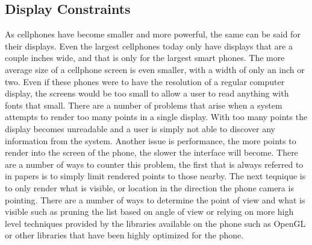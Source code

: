 \documentclass{acm_proc_article-sp}
\begin{document}
\subsection{Display Constraints}
As cellphones have become smaller and more powerful, the same can be said for their displays.  Even the largest cellphones today only have displays that are a couple inches wide, and that is only for the largest smart phones.  The more average size of a cellphone screen is even smaller, with a width of only an inch or two.  Even if these phones were to have the resolution of a regular computer display, the screens would be too small to allow a user to read anything with fonts that small.
There are a number of problems that arise when a system attempts to render too many points in a single display.  With too many points the display becomes unreadable and a user is simply not able to discover any information from the system.  Another issue is performance, the more points to render into the screen of the phone, the slower the interface will become.  There are a number of ways to counter this problem, the first that is always referred to in papers is to simply limit rendered points to those nearby.  \cite{pombinholocation} \cite{FIMEMORE} The next teqnique is to only render what is visible, or location in the direction the phone camera is pointing.  There are a number of ways to determine the point of view and what is visible such as pruning the list based on angle of view or relying on more high level techniques provided by the libraries available on the phone such as OpenGL or other libraries that have been highly optimized for the phone.  
\end{document}
